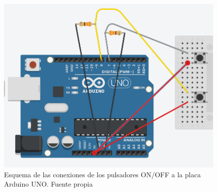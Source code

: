 \begin{figure}[h]
    \centering
    \includegraphics[width=1\textwidth]{img/conexionpulsadores.png}
    \caption{Esquema de las conexiones de los pulsadores ON/OFF a la placa Arduino UNO. Fuente propia}
    \label{fig:conexionpulsadores}
\end{figure}

